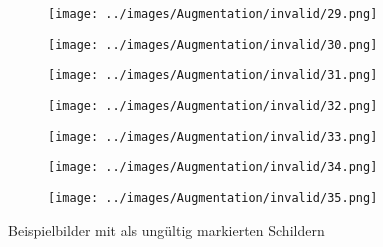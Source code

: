 \begin{figure}[H]
\hspace{1em}%
\begin{subfigure}[b]{0.1\textwidth}
\centering
\texttt{[image: ../images/Augmentation/invalid/29.png]}
\end{subfigure}
\hspace{1em}%
\begin{subfigure}[b]{0.1\textwidth}
\centering
\texttt{[image: ../images/Augmentation/invalid/30.png]}
\end{subfigure}
\hspace{1em}%
\begin{subfigure}[b]{0.1\textwidth}
\centering
\texttt{[image: ../images/Augmentation/invalid/31.png]}
\end{subfigure}
\hspace{1em}%
\begin{subfigure}[b]{0.1\textwidth}
\centering
\texttt{[image: ../images/Augmentation/invalid/32.png]}
\end{subfigure}
\hspace{1em}%
\begin{subfigure}[b]{0.1\textwidth}
\centering
\texttt{[image: ../images/Augmentation/invalid/33.png]}
\end{subfigure}
\hspace{1em}%
\begin{subfigure}[b]{0.1\textwidth}
\centering
\texttt{[image: ../images/Augmentation/invalid/34.png]}
\end{subfigure}
\hspace{1em}%
\begin{subfigure}[b]{0.1\textwidth}
\centering
\texttt{[image: ../images/Augmentation/invalid/35.png]}
\end{subfigure}
\caption{Beispielbilder mit als ungültig markierten Schildern}
\label{fig:invalid-imgs}
\end{figure}

